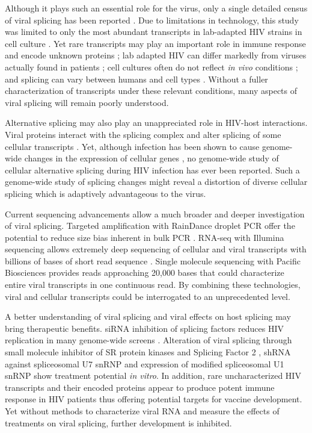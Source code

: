 \documentclass[../sherrill-Mix_thesis.tex]{subfiles}
\begin{document}
	 Although it plays such an essential role for the virus, only a single detailed census of viral splicing has been reported \citep{Purcell1993}. Due to limitations in technology, this study was limited to only the most abundant transcripts in lab-adapted HIV strains in cell culture \citep{Purcell1993}. Yet rare transcripts may play an important role in immune response \citep{Bansal2010} and encode unknown proteins \citep{Benko1990}; lab adapted HIV can differ markedly from viruses actually found in patients \citep{Fujita1992};  cell cultures often do not reflect \emph{in vivo} conditions \citep{McAllister1971}; and splicing can vary between humans \citep{Kwan2007,Hull2007} and cell types \citep{Wang2008,Barash2010}. Without a fuller characterization of transcripts under these relevant conditions, many aspects of viral splicing will remain poorly understood.

	Alternative splicing may also play an unappreciated role in HIV-host interactions. Viral proteins interact with the splicing complex \citep{Tange1996,Berro2006,Jager2012} and alter splicing of some cellular transcripts \citep{Kuramitsu2005,Hashizume2007}. Yet, although infection has been shown to cause genome-wide changes in the expression of cellular genes \citep{Vahey2002,Wout2003,Mitchell2003,Rotger2010,Chang2011}, no genome-wide study of cellular alternative splicing during HIV infection has ever been reported. Such a genome-wide study of splicing changes might reveal a distortion of diverse cellular splicing which is adaptively advantageous to the virus. 

	Current sequencing advancements allow a much broader and deeper investigation of viral splicing. Targeted amplification with RainDance droplet PCR offer the potential to reduce size bias inherent in bulk PCR \citep{Tewhey2009}. RNA-seq with Illumina sequencing allows extremely deep sequencing of cellular and viral transcripts with billions of bases of short read sequence \citep{Marioni2008,Morin2008}. Single molecule sequencing with Pacific Biosciences provides reads approaching 20,000 bases \citep{Eid2009,Schaefer2012} that could characterize entire viral transcripts in one continuous read. By combining these technologies, viral and cellular transcripts could be interrogated to an unprecedented level.

	A better understanding of viral splicing and viral effects on host splicing may bring therapeutic benefits. siRNA inhibition of splicing factors reduces HIV replication in many genome-wide screens \citep{Brass2008,Konig2008,Bushman2009}. Alteration of viral splicing through small molecule inhibitor of SR protein kinases\citep{Fukuhara2006} and Splicing Factor 2 \citep{Bakkour2007}, shRNA against spliceosomal U7 snRNP \citep{Asparuhova2007} and expression of modified spliceosomal U1 snRNP \citep{Mandal2010} show treatment potential \emph{in vitro}. In addition, rare uncharacterized HIV transcripts and their encoded proteins appear to produce potent immune response in HIV patients \citep{Bansal2010} thus offering potential targets for vaccine development. Yet without methods to characterize viral RNA and measure the effects of treatments on viral splicing, further development is inhibited. 
\end{document}
